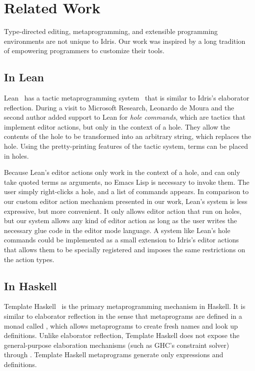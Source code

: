\section{Related Work} \label{sec:relatedwork}


Type-directed editing, metaprogramming, and extensible programming
environments are not unique to Idris. Our work was inspired by a long
tradition of empowering programmers to customize their tools.

\subsection{In Lean}


Lean~\cite{lean} has a tactic metaprogramming system~\cite{leanmeta}
that is similar to Idris's elaborator reflection.  During a visit to
Microsoft Research, Leonardo de Moura and the second author added
support to Lean for \emph{hole commands}, which are tactics that implement
editor actions, but only in the context of a hole. They allow the
contents of the hole to be transformed into an arbitrary string, which
replaces the hole. Using the pretty-printing features of the tactic
system, terms can be placed in holes.

Because Lean's editor actions only work in the context of a hole, and
can only take quoted terms as arguments, no Emacs Lisp is necessary to
invoke them. The user simply right-clicks a hole, and a list of
commands appears.  In comparison to our custom editor action mechanism
presented in our work, Lean's system is less expressive, but more
convenient.  It only allows editor action that run on holes, but our
system allows any kind of editor action as long as the user writes the
necessary glue code in the editor mode language.
A system like Lean's hole commands could be implemented as a small
extension to Idris's editor actions that allows them to be specially
registered and imposes the same restrictions on the action types.

\subsection{In Haskell}

Template Haskell~\cite{th} is the primary metaprogramming mechanism in
Haskell.  It is similar to elaborator reflection in the sense that
metaprograms are defined in a monad called , which allows
metaprograms to create fresh names and look up definitions.  Unlike
elaborator reflection, Template Haskell does not expose the
general-purpose elaboration mechanisms (such as GHC's constraint
solver) through .  Template Haskell metaprograms generate only
expressions and definitions.

